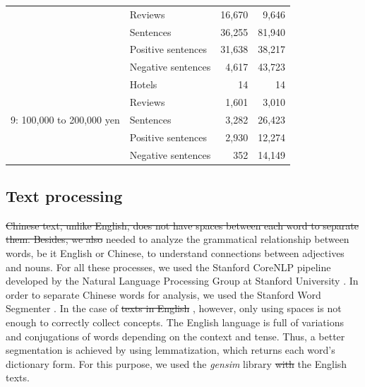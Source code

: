 \documentclass[smallextended,natbib]{svjour3}       %
\providecommand{\DIFadd}[1]{{\protect\color{blue}\uwave{#1}}} %
\providecommand{\DIFdel}[1]{{\protect\color{red}\sout{#1}}}                      %
\providecommand{\DIFaddbegin}{} %
\providecommand{\DIFaddend}{} %
\providecommand{\DIFdelbegin}{} %
\providecommand{\DIFdelend}{} %
\newcommand{\DIFscaledelfig}{0.5}
\newlength{\DIFdelgraphicswidth} %
\newlength{\DIFdelgraphicsheight} %
\newcommand{\DIFaddincludegraphics}[2][]{{\color{blue}\fbox{\DIFOincludegraphics[#1]{#2}}}} %
\newcommand{\DIFdelincludegraphics}[2][]{%
\sbox{\DIFdelgraphicsbox}{\DIFOincludegraphics[#1]{#2}}%
\settoboxwidth{\DIFdelgraphicswidth}{\DIFdelgraphicsbox} %
\settoboxtotalheight{\DIFdelgraphicsheight}{\DIFdelgraphicsbox} %
\scalebox{\DIFscaledelfig}{%
\parbox[b]{\DIFdelgraphicswidth}{\usebox{\DIFdelgraphicsbox}\\[-\baselineskip] \rule{\DIFdelgraphicswidth}{0em}}\llap{\resizebox{\DIFdelgraphicswidth}{\DIFdelgraphicsheight}{%
\setlength{\unitlength}{\DIFdelgraphicswidth}%
\begin{picture}(1,1)%
\thicklines\linethickness{2pt} %
{\color[rgb]{1,0,0}\put(0,0){\framebox(1,1){}}}%
{\color[rgb]{1,0,0}\put(0,0){\line( 1,1){1}}}%
{\color[rgb]{1,0,0}\put(0,1){\line(1,-1){1}}}%
\end{picture}%
}\hspace*{3pt}}} %
} %
\DeclareRobustCommand{\DIFaddbegin}{\DIFOaddbegin \let\includegraphics\DIFaddincludegraphics} %
\DeclareRobustCommand{\DIFaddend}{\DIFOaddend \let\includegraphics\DIFOincludegraphics} %
\DeclareRobustCommand{\DIFdelbegin}{\DIFOdelbegin \let\includegraphics\DIFdelincludegraphics} %
\DeclareRobustCommand{\DIFdelend}{\DIFOaddend \let\includegraphics\DIFOincludegraphics} %
\begin{document}
\begin{table}[ht]
{\begin{tabular}{|l|l|r|r|}
                                                   & Reviews            & 16,670  & 9,646   \\
                                                   & Sentences          & 36,255  & 81,940  \\
                                                   & Positive sentences & 31,638  & 38,217  \\
                                                   & Negative sentences & 4,617   & 43,723  \\ \hline
        \multirow{5}{*}{9: 100,000 to 200,000 yen}   & Hotels             & 14      & 14      \\
                                                   & Reviews            & 1,601   & 3,010   \\
                                                   & Sentences          & 3,282   & 26,423  \\
                                                   & Positive sentences & 2,930   & 12,274  \\
                                                   & Negative sentences & 352     & 14,149  \\ \hline
        \end{tabular}%
      }
    \end{table}
  \subsection{Text processing}\label{textprocessing}

    \DIFdelbegin \DIFdel{Chinese text, unlike English, does not have spaces between each word to separate them. Besides, we also }\DIFdelend \DIFaddbegin \DIFadd{We }\DIFaddend needed to analyze the grammatical relationship between words, be it English or Chinese, to understand connections between adjectives and nouns. For all these processes, we used the Stanford CoreNLP pipeline developed by the Natural Language Processing Group at Stanford University \cite[][]{manning-EtAl:2014:P14-5}. In order to separate Chinese words for analysis, we used the Stanford Word Segmenter \cite[][]{chang2008}. In the case of \DIFdelbegin \DIFdel{texts in English }\DIFdelend \DIFaddbegin \DIFadd{English texts}\DIFaddend , however, only using spaces is not enough to correctly collect concepts. The English language is full of variations and conjugations of words depending on the context and tense. Thus, a better segmentation is achieved by using lemmatization, which returns each word's dictionary form. For this purpose, we used the \textit{gensim} library \DIFdelbegin \DIFdel{with }\DIFdelend \DIFaddbegin \DIFadd{for }\DIFaddend the English texts.
\end{document}
